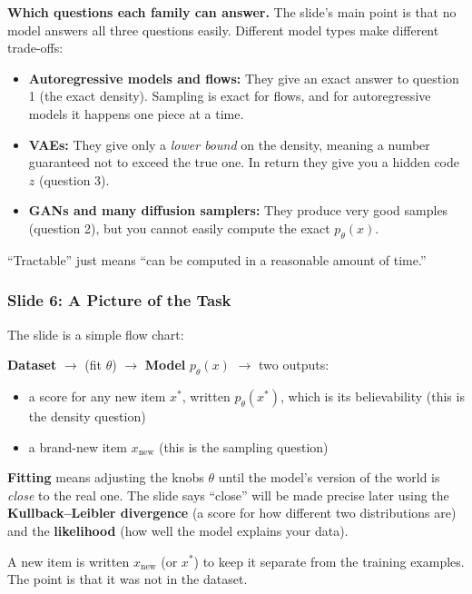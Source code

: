 \textbf{Which questions each family can answer.} The slide's main point is that no model answers all three questions easily. Different model types make different trade-offs:

\begin{itemize}
  \item \textbf{Autoregressive models and flows:} They give an exact answer to question 1 (the exact density). Sampling is exact for flows, and for autoregressive models it happens one piece at a time.
  \item \textbf{VAEs:} They give only a \textit{lower bound} on the density, meaning a number guaranteed not to exceed the true one. In return they give you a hidden code $z$ (question 3).
  \item \textbf{GANs and many diffusion samplers:} They produce very good samples (question 2), but you cannot easily compute the exact $p_\theta(x)$.
\end{itemize}

``Tractable'' just means ``can be computed in a reasonable amount of time.''

\subsubsection*{Slide 6: A Picture of the Task}

The slide is a simple flow chart:

\textbf{Dataset} $\rightarrow$ (fit $\theta$) $\rightarrow$ \textbf{Model} $p_\theta(x)$ $\rightarrow$ two outputs:

\begin{itemize}
  \item a score for any new item $x^*$, written $p_\theta(x^*)$, which is its believability (this is the density question)
  \item a brand-new item $x_{\text{new}}$ (this is the sampling question)
\end{itemize}

\textbf{Fitting} means adjusting the knobs $\theta$ until the model's version of the world is \textit{close} to the real one. The slide says ``close'' will be made precise later using the \textbf{Kullback--Leibler divergence} (a score for how different two distributions are) and the \textbf{likelihood} (how well the model explains your data).

A new item is written $x_{\text{new}}$ (or $x^*$) to keep it separate from the training examples. The point is that it was not in the dataset.

